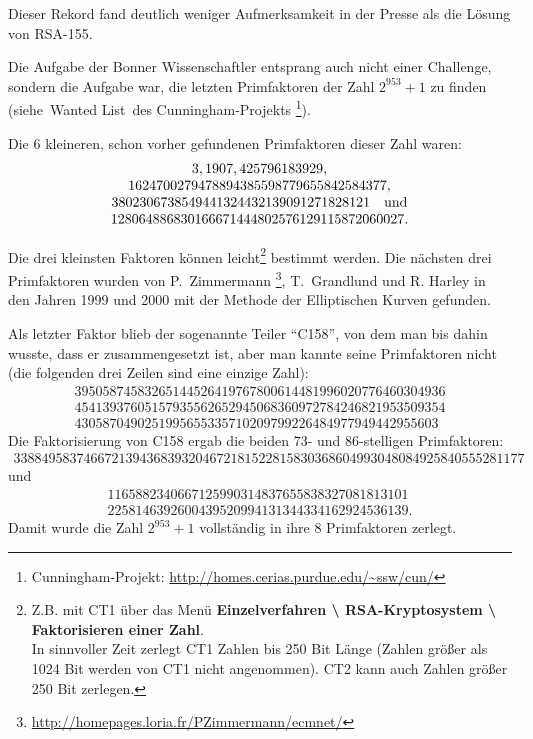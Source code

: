 \begin{refsegment}
Dieser Rekord fand deutlich weniger Aufmerksamkeit in der Presse als die
Lösung von RSA-155.

Die Aufgabe der Bonner Wissenschaftler entsprang auch nicht einer Challenge,
sondern die Aufgabe war, die letzten Primfaktoren der Zahl $2^{953}+1$
zu finden (siehe~\glqq Wanted List\grqq~des Cunningham-Projekts%
\footnote{%
Cunningham-Projekt: \url{http://homes.cerias.purdue.edu/~ssw/cun/}}).

Die 6 kleineren, schon vorher gefundenen Primfaktoren dieser Zahl waren:
$$
\begin{array}{c}
        3, 1907, 425796183929,\\
        1624700279478894385598779655842584377,\\
        3802306738549441324432139091271828121 \quad{\rm und}\\
        128064886830166671444802576129115872060027.
\end{array}
$$
\begin{sloppypar}
Die drei kleinsten Faktoren können leicht\footnote{%
Z.B. mit CT1 über das Menü
\textbf{Einzelverfahren \textbackslash{} RSA-Kryptosystem \textbackslash{}
Faktorisieren einer Zahl}.\\
In sinnvoller Zeit zerlegt CT1 Zahlen bis 250 Bit Länge (Zahlen größer als
1024 Bit werden von CT1 nicht angenommen). CT2 kann auch
Zahlen größer 250 Bit zerlegen.
}
bestimmt werden.
Die nächsten drei Primfaktoren wurden von P.~Zimmermann%
\footnote{\url{http://homepages.loria.fr/PZimmermann/ecmnet/}},
T.~Grandlund und R. Harley in den Jahren 1999 und 2000 mit der Methode
der Elliptischen Kurven gefunden.
\end{sloppypar}

Als letzter Faktor blieb der sogenannte Teiler  "`C158"',
von dem man bis dahin wusste, dass er zusammengesetzt ist, aber man kannte
seine Primfaktoren nicht (die folgenden drei Zeilen sind eine einzige Zahl):
$$
\begin{array}{c}
39505874583265144526419767800614481996020776460304936\\
45413937605157935562652945068360972784246821953509354\\
4305870490251995655335710209799226484977949442955603
\end{array}
$$
Die Faktorisierung von C158 ergab die beiden 73- und 86-stelligen Primfaktoren:
$$
\begin{array}{c}
3388495837466721394368393204672181522815830368604993048084925840555281177
\end{array}
$$
und
$$
\begin{array}{c}
1165882340667125990314837655838327081813101\\
2258146392600439520994131344334162924536139.
\end{array}
$$
Damit wurde die Zahl $2^{953}+1$ vollständig in ihre 8 Primfaktoren zerlegt.


\end{refsegment}
